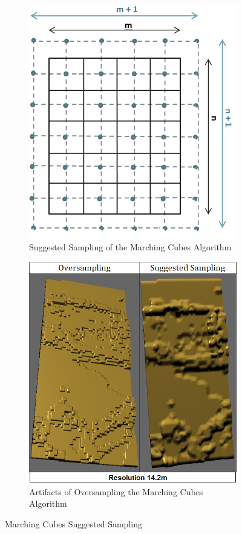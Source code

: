 \documentclass{subfiles}
\begin{document}
    \begin{figure} [h!]
    	\begin{subfigure}[t]{.49\textwidth}
    		
    		\centering
    		\includegraphics[width=.9\textwidth]{img/Sampling}
    		\caption{Suggested Sampling of the Marching Cubes Algorithm}
    		\label{fig:ExpectedSampling}
    	\end{subfigure} \hfill
    	\begin{subfigure}[t]{.49\textwidth}
    		\centering
    		\includegraphics[width=.9\textwidth]{img/OversamplingVsSuggestedSampling}
    		\caption{Artifacts of Oversampling the Marching Cubes Algorithm} 
    		\label{fig:SamplingArtifacts}
    	\end{subfigure} \hfill
    	\caption{Marching Cubes Suggested Sampling}
    	\label{fig:MCSampling}
    \end{figure}
\end{document}

